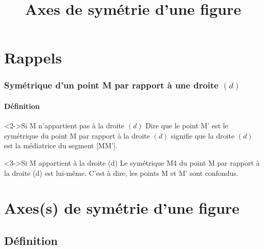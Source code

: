 \documentclass[xcolor={dvipsnames}]{beamer}
\title{Axes de symétrie d'une figure}
\author{}\institute{}
\begin{document}
\begin{frame}
  \titlepage
\end{frame}


\section{Rappels}

\begin{frame}
\frametitle{Symétrique d'un point M par rapport à une droite $(d)$}  
\framesubtitle{Définition}

\begin{block}<2->{Si M n'appartient pas à la droite $(d)$}
Dire que le point M' est le symétrique du point M par rapport à la droite $(d)$ signifie que la droite $(d)$ est la médiatrice du segment [MM'].
\end{block}

\begin{block}<3->{Si M appartient à la droite (d)}
Le symétrique M4 du point M par rapport à la droite (d) est lui-même.
C'est à dire, les points M et M' sont confondus.
\end{block}

\end{frame}

\section{Axes(s) de symétrie d'une figure}

\subsection{Définition}
\end{document}
